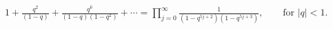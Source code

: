 $1 + \frac{q^2}{(1-q)}  + \frac{q^6}{(1-q)(1-q^2)} + \cdots =\prod_{j=0}^{\infty}  \frac{1}{(1-q^{5j+2})(1-q^{5j+3})},     \quad\quad \text{for $|q|<1$}.$